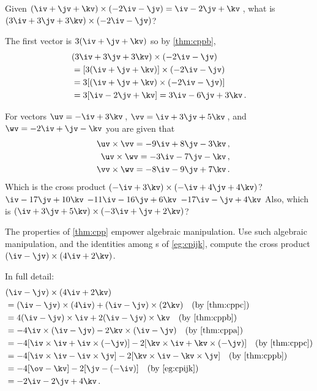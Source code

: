 \begin{example} 
Given \((\iv+\jv+\kv)\times(-2\iv-\jv)=\iv-2\jv+\kv\)\,, what is \((3\iv+3\jv+3\kv)\times(-2\iv-\jv)\)?
\begin{solution} 
The first vector is \(3(\iv+\jv+\kv)\) so by \cref{thm:cppb},
\begin{align*}
&(3\iv+3\jv+3\kv)\times(-2\iv-\jv)
\\&=[3(\iv+\jv+\kv)]\times(-2\iv-\jv)
\\&=3[(\iv+\jv+\kv)\times(-2\iv-\jv)]
\\&=3[\iv-2\jv+\kv]=3\iv-6\jv+3\kv\,.
\end{align*}
\end{solution}
\end{example}


\begin{activity}  
For vectors \(\uv=-\iv+3\kv\)\,, \(\vv=\iv+3\jv+5\kv\)\,, and \(\wv=-2\iv+\jv-\kv\) you are given that 
\begin{eqnarray*}
&&\uv\times\vv=-9\iv+8\jv-3\kv\,,
\\&&\uv\times\wv=-3\iv-7\jv-\kv\,,
\\&&\vv\times\wv=-8\iv-9\jv+7\kv\,.
\end{eqnarray*}
Which is the cross product \((-\iv+3\kv)\times(-\iv+4\jv+4\kv)\)?
\actposs{\(-12\iv+\jv-4\kv\)}
{\(\iv-17\jv+10\kv\)}
{\(-11\iv-16\jv+6\kv\)}
{\(-17\iv-\jv+4\kv\)}
Also, which is \((\iv+3\jv+5\kv)\times(-3\iv+\jv+2\kv)\)? %
\end{activity}




\begin{example} 
The properties of \cref{thm:cpp} empower algebraic manipulation.
Use such algebraic manipulation, and the identities among s of \cref{eg:cpijk}, compute the cross product \((\iv-\jv)\times(4\iv+2\kv)\).
\begin{solution} In full detail:
\begin{align*}
&(\iv-\jv)\times(4\iv+2\kv)
\\&=(\iv-\jv)\times(4\iv)+(\iv-\jv)\times(2\kv) 
\quad(\text{by \ref{thm:cppc}})
\\&=4(\iv-\jv)\times\iv+2(\iv-\jv)\times\kv
\quad(\text{by \ref{thm:cppb}})
\\&=-4\iv\times(\iv-\jv)-2\kv\times(\iv-\jv)
\quad(\text{by \ref{thm:cppa}})
\\&=-4[\iv\times\iv+\iv\times(-\jv)]-2[\kv\times\iv+\kv\times(-\jv)]
\quad(\text{by \ref{thm:cppc}})
\\&=-4[\iv\times\iv-\iv\times\jv]-2[\kv\times\iv-\kv\times\jv]
\quad(\text{by \ref{thm:cppb}})
\\&=-4[\ov-\kv]-2[\jv-(-\iv)]
\quad(\text{by \cref{eg:cpijk}})
\\&=-2\iv-2\jv+4\kv\,.
\end{align*}
\end{solution}
\end{example}







